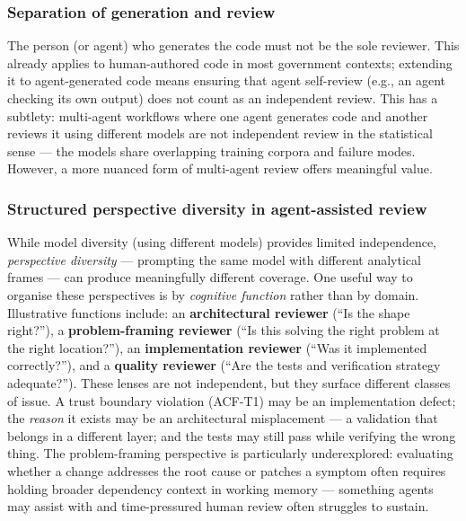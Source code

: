 \documentclass[a4paper,11pt]{report}
\begin{document}
\hypertarget{separation-of-generation-and-review}{%
\subsubsection{Separation of generation and
review}\label{separation-of-generation-and-review}}

The person (or agent) who generates the code must not be the sole
reviewer. This already applies to human-authored code in most government
contexts; extending it to agent-generated code means ensuring that agent
self-review (e.g., an agent checking its own output) does not count as
an independent review. This has a subtlety: multi-agent workflows where
one agent generates code and another reviews it using different models
are not independent review in the statistical sense --- the models share
overlapping training corpora and failure modes. However, a more nuanced
form of multi-agent review offers meaningful value.

\hypertarget{structured-perspective-diversity-in-agent-assisted-review}{%
\subsubsection{Structured perspective diversity in agent-assisted
review}\label{structured-perspective-diversity-in-agent-assisted-review}}

While model diversity (using different models) provides limited
independence, \emph{perspective diversity} --- prompting the same model
with different analytical frames --- can produce meaningfully different
coverage. One useful way to organise these perspectives is by
\emph{cognitive function} rather than by domain. Illustrative functions
include: an \textbf{architectural reviewer} (``Is the shape right?''), a
\textbf{problem-framing reviewer} (``Is this solving the right problem
at the right location?''), an \textbf{implementation reviewer} (``Was it
implemented correctly?''), and a \textbf{quality reviewer} (``Are the
tests and verification strategy adequate?''). These lenses are not
independent, but they surface different classes of issue. A trust
boundary violation (ACF-T1) may be an implementation defect; the
\emph{reason} it exists may be an architectural misplacement --- a
validation that belongs in a different layer; and the tests may still
pass while verifying the wrong thing. The problem-framing perspective is
particularly underexplored: evaluating whether a change addresses the
root cause or patches a symptom often requires holding broader
dependency context in working memory --- something agents may assist
with and time-pressured human review often struggles to sustain.
\end{document}
